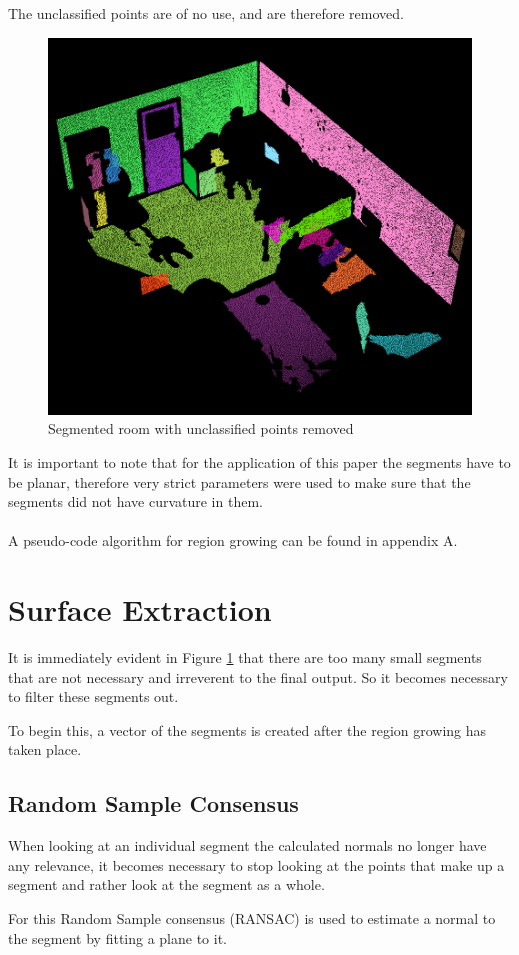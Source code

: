 		The unclassified points are of no use, and are therefore removed.
		
		
		\begin{figure}[H]
			\centering
			\includegraphics[width=0.6\linewidth]{Includes/images/RG-noUnclass}
			\caption{Segmented room with unclassified points removed}
			\label{fig:RG-noUnclass}
		\end{figure}
		
		
		It is important to note that for the application of this paper the segments have to be planar, therefore very strict parameters were used to make sure that the segments did not have curvature in them.\\
		\\
		A pseudo-code algorithm for region growing can be found in appendix A.
		
	
\section{Surface Extraction}
	It is immediately evident in Figure \ref{fig:RG-noUnclass} that there are too many small segments that are not necessary and irreverent to the final output. So it becomes necessary to filter these segments out.
	
	To begin this, a vector of the segments is created after the region growing has taken place.
	
		\subsection{Random Sample Consensus}
			When looking at an individual segment the calculated normals no longer have any relevance, it becomes necessary to stop looking at the points that make up a segment and rather look at the segment as a whole. 
			
			For this Random Sample consensus (RANSAC) is used to estimate a normal to the segment by fitting a plane to it.
			
